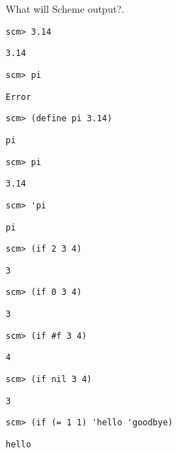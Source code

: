 \begin{blocksection}
\question What will Scheme output?.

\begin{lstlisting}
scm> 3.14
\end{lstlisting}
\begin{solution}[0.25in] 
\texttt{3.14}
\end{solution}

\begin{lstlisting}
scm> pi
\end{lstlisting}
\begin{solution}[0.25in]
\texttt{Error}
\end{solution}

\begin{lstlisting}
scm> (define pi 3.14)
\end{lstlisting}
\begin{solution}[0.25in]
\texttt{pi}
\end{solution}

\begin{lstlisting}
scm> pi
\end{lstlisting}
\begin{solution}[.25in]
\texttt{3.14}
\end{solution}

\begin{lstlisting}
scm> 'pi
\end{lstlisting}
\begin{solution}[.25in]
\texttt{pi}
\end{solution}

\begin{lstlisting}
scm> (if 2 3 4)
\end{lstlisting}
\begin{solution}[.25in]
\texttt{3}
\end{solution}

\begin{lstlisting}
scm> (if 0 3 4)
\end{lstlisting}
\begin{solution}[.25in]
\texttt{3}
\end{solution}

\begin{lstlisting}
scm> (if #f 3 4)
\end{lstlisting}
\begin{solution}[.25in]
\texttt{4}
\end{solution}

\begin{lstlisting}
scm> (if nil 3 4)
\end{lstlisting}
\begin{solution}[.25in]
\texttt{3}
\end{solution}

\begin{lstlisting}
scm> (if (= 1 1) 'hello 'goodbye)
\end{lstlisting}
\begin{solution}[.25in]
\texttt{hello}
\end{solution}
\end{blocksection}

